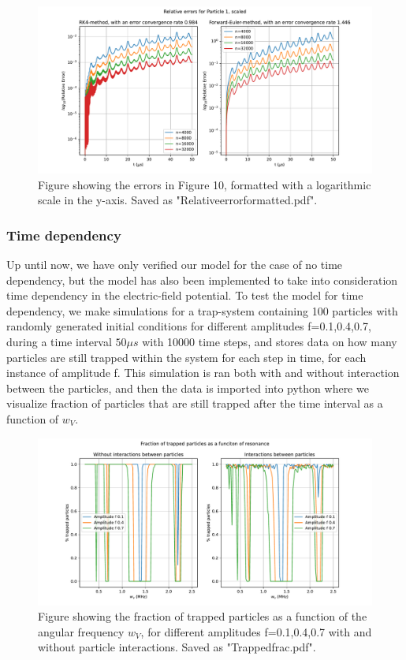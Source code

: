 \documentclass[english,notitlepage,reprint,nofootinbib,twocolumn]{article}
\begin{document}
\begin{figure}[H]
    \centering
    \includegraphics[width = .45\textwidth]{Relativeerrorformatted.pdf} 
    \caption{Figure showing the errors in Figure 10, formatted with a logarithmic scale in the y-axis. Saved as "Relativeerrorformatted.pdf".}
    \label{fig: ee251}
\end{figure} 

\subsubsection{Time dependency}
Up until now, we have only verified our model for the case of no time dependency, but the model has also been implemented to take into consideration time dependency in the electric-field potential. To test the model for time dependency, we make simulations for a trap-system containing 100 particles with randomly generated initial conditions for different amplitudes f=0.1,0.4,0.7, during a time interval $50 \mu s$ with 10000 time steps, and stores data on how many particles are still trapped within the system for each step in time, for each instance of amplitude f. This simulation is ran both with and without interaction between the particles, and then the data is imported into python where we visualize fraction of particles that are still trapped after the time interval as a function of $w_V$.
\begin{figure}[H]
    \centering
    \includegraphics[width = .45\textwidth]{Trappedfrac.pdf} 
    \caption{Figure showing the fraction of trapped particles as a function of the angular frequency $w_V$, for different amplitudes f=0.1,0.4,0.7 with and without particle interactions. Saved as "Trappedfrac.pdf".}
    \label{fig: ee251}
\end{figure} 
\end{document}
